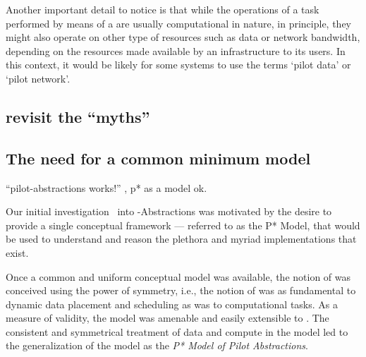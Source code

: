 \documentclass{sig-alternate}
\begin{document}

Another important detail to notice is that while the operations of a
task performed by means of a \pilot are usually computational in
nature, in principle, they might also operate on other type of
resources such as data or network bandwidth, depending on the
resources made available by an infrastructure to its users. In this
context, it would be likely for some \pilotjob systems to use the
terms `pilot data' or `pilot network'.



\subsection{revisit the ``myths''}


\subsection{The need for a common minimum model}

``pilot-abstractions works!'' , p* as a model ok.


Our initial investigation~\cite{Luckow:2008la} into
\pilot-Abstractions was motivated by the desire to provide a single
conceptual framework --- referred to as the P* Model, that would be
used to understand and reason the plethora and myriad \pilotjob
implementations that exist.


Once a common and uniform conceptual model was available, the notion
of \pilotdata was conceived using the power of symmetry, i.e., the
notion of \pilotdata was as fundamental to dynamic data placement and
scheduling as \pilotjobs was to computational tasks. As a measure of
validity, the \pstar model was amenable and easily extensible to
\pilotdata.  The consistent and symmetrical treatment of data and
compute in the model led to the generalization of the model as the
{\it P* Model of Pilot Abstractions}.
\end{document}
